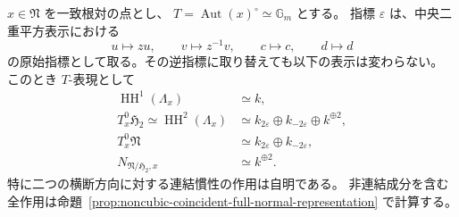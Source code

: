 \begin{proposition}[一致根対における連結慣性の接表現]
\label{prop:noncubic-coincident-torus-weights}
$x\in\mathfrak N$ を一致根対の点とし、
$T=\operatorname{Aut}(x)^\circ\simeq\mathbb G_m$ とする。
指標 $\varepsilon$ は、中央二重平方表示における
\[
 u\longmapsto z u,\qquad v\longmapsto z^{-1}v,
 \qquad c\longmapsto c,\qquad d\longmapsto d
\]
の原始指標として取る。その逆指標に取り替えても以下の表示は変わらない。
このとき $T$-表現として
\[
 \begin{split}
 \operatorname{HH}^1(\Lambda_x)&\simeq k,\\
 T^0_x\mathfrak H_2\simeq\operatorname{HH}^2(\Lambda_x)
   &\simeq k_{2\varepsilon}\oplus k_{-2\varepsilon}\oplus k^{\oplus2},\\
 T^0_x\mathfrak N&\simeq k_{2\varepsilon}\oplus k_{-2\varepsilon},\\
 N_{\mathfrak N/\mathfrak H_2,x}&\simeq k^{\oplus2}.
 \end{split}
\]
特に二つの横断方向に対する連結慣性の作用は自明である。
非連結成分を含む全作用は命題~\ref{prop:noncubic-coincident-full-normal-representation} で計算する。
\end{proposition}
